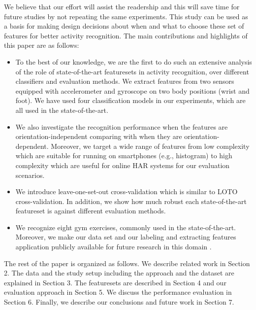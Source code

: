 \documentclass[journal,article,submit,moreauthors,pdftex]{Definitions/mdpi}
\begin{document}
We believe that our effort will assist the readership and this will save time for future studies by not repeating the same experiments. This study can be used as a basis for making design decisions about when and what to choose these set of features for better activity recognition. The main contributions and highlights of this paper are as follows:

\begin{itemize}
	\item To the best of our knowledge, we are the first to do such an extensive analysis of the role of state-of-the-art featuresets in activity recognition, over different classifiers and evaluation methods. We extract features from two sensors equipped with accelerometer and gyroscope on two body positions (wrist and foot). We have used four classification models in our experiments, which are all used in the state-of-the-art. 
	\item We also investigate the recognition performance when the features are orientation-independent comparing with when they are orientation-dependent. Moreover, we target a wide range of features from low complexity which are suitable for running on smartphones (e.g., histogram) to high complexity which are useful for online HAR systems\cite{morris2014recofit} for our evaluation scenarios.
	\item We introduce leave-one-set-out cross-validation which is similar to LOTO cross-validation. In addition, we show how much robust each state-of-the-art featureset is against different evaluation methods.
	\item We recognize eight gym exercises, commonly used in the state-of-the-art. Moreover, we make our data set and our labeling and extracting features application publicly available for future research in this domain \cite{gymDataset}.
\end{itemize}


The rest of the paper is organized as follows. We describe related work in Section 2. The data and the study setup including the approach and the dataset are explained in Section 3. The featuresets are described in Section 4 and our evaluation approach in Section 5. We discuss the performance evaluation in Section 6. Finally, we describe our conclusions and future work in Section 7.
\end{document}
